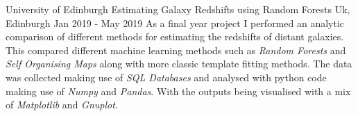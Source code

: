     \cventry
    {University of Edinburgh}
    {Estimating Galaxy Redshifts using Random Forests}
    {Uk, Edinburgh}
    {Jan 2019 - May 2019}
     {%
     As a final year project I performed an analytic comparison of different methods for estimating the redshifts of distant galaxies. This compared different machine learning methods such as \textit{Random Forests} and \textit{Self Organising Maps} along with more classic template fitting methods. The data was collected making use of \textit{SQL Databases} and analysed with python code making use of \textit{Numpy} and \textit{Pandas}. With the outputs being visualised with a mix of \textit{Matplotlib} and \textit{Gnuplot}.\newline}
   